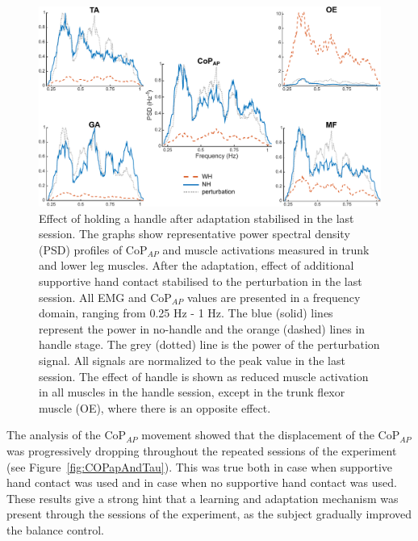 \documentclass[final,5p,twocolumn]{elsarticle}
\begin{document}
\begin{figure}
	\begin{center}
		\includegraphics[width=\linewidth]{images/representativePSD_oneYaxis-v1.pdf}
		\caption{Effect of holding a handle after adaptation stabilised in the last session. The graphs show representative power spectral density (PSD) profiles of CoP$_{AP}$ and muscle activations measured in trunk and lower leg muscles. After the adaptation, effect of additional supportive hand contact stabilised to the perturbation in the last session. All EMG and CoP$_{AP}$ values are presented in a frequency domain, ranging from 0.25 Hz - 1 Hz. The blue (solid) lines represent the power in no-handle and the orange (dashed) lines in handle stage. The grey (dotted) line is the power of the perturbation signal. All signals are normalized to the peak value in the last session. The effect of handle is shown as reduced muscle activation in all muscles in the handle session, except in the trunk flexor muscle (OE), where there is an opposite effect.}
		\label{fig:representativePSD}
	\end{center}
\end{figure}

The analysis of the CoP$_{AP}$ movement showed that the displacement of the CoP$_{AP}$ was progressively dropping throughout the repeated sessions of the experiment (see Figure~\ref{fig:COPapAndTau}). This was true both in case when supportive hand contact was used and in case when no supportive hand contact was used. These results give a strong hint that a learning and adaptation mechanism was present through the sessions of the experiment, as the subject gradually improved the balance control.
\end{document}
